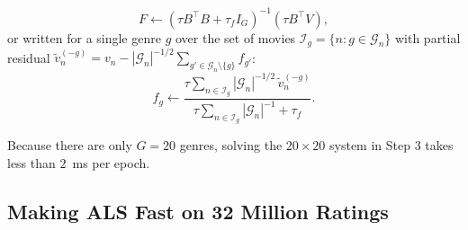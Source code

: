 \documentclass{article}
\theoremstyle{plain}
\theoremstyle{definition}
\begin{document}
\begin{enumerate}
    \begin{equation}
    F \leftarrow \left( \tau B^\top B + \tau_f I_G \right)^{-1} \left( \tau B^\top V \right),
    \label{eq:genre_matrix_update}
    \end{equation}
    or written for a single genre $g$ over the set of movies $\mathcal{I}_g = \{n : g \in \mathcal{G}_n\}$ with partial residual $\tilde{v}_n^{(-g)} = v_n - |\mathcal{G}_n|^{-1/2} \sum_{g' \in \mathcal{G}_n \setminus \{g\}} f_{g'}$:
    \begin{equation}
    f_g \leftarrow \frac{\tau \sum_{n \in \mathcal{I}_g} |\mathcal{G}_n|^{-1/2} \, \tilde{v}_n^{(-g)}}{\tau \sum_{n \in \mathcal{I}_g} |\mathcal{G}_n|^{-1} + \tau_f}.
    \label{eq:genre_coord_update}
    \end{equation}
\end{enumerate}
Because there are only $G = 20$ genres, solving the $20 \times 20$ system in Step 3 takes less than $2$~ms per epoch.

\subsection{Making ALS Fast on 32 Million Ratings}
\label{sec:fast_cholesky}
\end{document}
